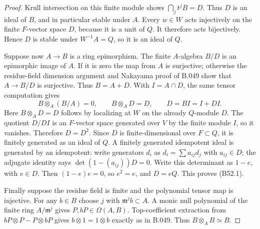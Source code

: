 \begin{proof}
Krull intersection on this finite module shows
$\bigcap_j t^j B=D$. Thus $D$ is an ideal of
$B$, and in particular stable under $A$.
Every $w\in W$ acts injectively on the finite
$F$-vector space $D$, because it is a unit of $Q$.
It therefore acts bijectively. Hence $D$ is stable
under $W^{-1}A=Q$, so it is an ideal of $Q$.

Suppose now $A\to B$ is a ring epimorphism.
The finite $A$-algebra $B/D$ is an epimorphic image
of $A$. If it is zero the map from $A$ is surjective;
otherwise the residue-field dimension argument
and Nakayama proof of B.049 show that $A\to B/D$
is surjective. Thus $B=A+D$. With $I=A\cap D$,
the same tensor computation gives
\[
 B\otimes_A(B/A)=0,\qquad B\otimes_A D=D,\qquad
                         D=BI=I+DI.
\]
Here $B\otimes_A D=D$ follows by localizing at
$W$ on the already $Q$-module $D$.
The quotient $D/DI$ is an $F$-vector space generated
over $V$ by the finite module $I$, so it vanishes.
Therefore $D=D^2$.
Since $D$ is finite-dimensional over $F\subset Q$,
it is finitely generated as an ideal of $Q$.
A finitely generated idempotent ideal is generated
by an idempotent: write generators $d_i$ as
$d_i=\sum a_{ij}d_j$ with $a_{ij}\in D$;
the adjugate identity says $\det(1-(a_{ij}))D=0$.
Write this determinant as $1-e$, with $e\in D$.
Then $(1-e)e=0$, so $e^2=e$, and $D=eQ$.
This proves (B52.1).

Finally suppose the residue field is finite and
the polynomial tensor map is injective. For any
$b\in B$ choose $j$ with $\mathfrak m^j b\subset A$.
A monic null polynomial of the finite ring
$A/\mathfrak m^j$ gives $P,bP\in\Omega(A,B)$.
Top-coefficient extraction from
$bP\otimes P-P\otimes bP$ gives
$b\otimes1=1\otimes b$ exactly as in B.049.
Thus $B\otimes_A B\simeq B$.
\end{proof}


